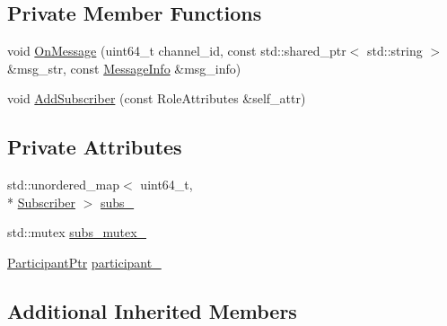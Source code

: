 \subsection*{Private Member Functions}
\begin{DoxyCompactItemize}
\item 
void \hyperlink{classapollo_1_1cyber_1_1transport_1_1RtpsDispatcher_a59c0136136c1062cb86462ff2a4e7acc}{On\-Message} (uint64\-\_\-t channel\-\_\-id, const std\-::shared\-\_\-ptr$<$ std\-::string $>$ \&msg\-\_\-str, const \hyperlink{classapollo_1_1cyber_1_1transport_1_1MessageInfo}{Message\-Info} \&msg\-\_\-info)
\item 
void \hyperlink{classapollo_1_1cyber_1_1transport_1_1RtpsDispatcher_afe72ad9b8c0d3c5a94fb623a334013c1}{Add\-Subscriber} (const Role\-Attributes \&self\-\_\-attr)
\end{DoxyCompactItemize}
\subsection*{Private Attributes}
\begin{DoxyCompactItemize}
\item 
std\-::unordered\-\_\-map$<$ uint64\-\_\-t, \\*
\hyperlink{structapollo_1_1cyber_1_1transport_1_1Subscriber}{Subscriber} $>$ \hyperlink{classapollo_1_1cyber_1_1transport_1_1RtpsDispatcher_a8ff80d52b17b3a5c07d960078ee14914}{subs\-\_\-}
\item 
std\-::mutex \hyperlink{classapollo_1_1cyber_1_1transport_1_1RtpsDispatcher_a78bc088bc5b4c3d9fb0624e4d9a8b098}{subs\-\_\-mutex\-\_\-}
\item 
\hyperlink{namespaceapollo_1_1cyber_1_1transport_a4214d0780331276d0384d0b57e3bc688}{Participant\-Ptr} \hyperlink{classapollo_1_1cyber_1_1transport_1_1RtpsDispatcher_a8c472e08afebd0087e51fe5b9eeae6e4}{participant\-\_\-}
\end{DoxyCompactItemize}
\subsection*{Additional Inherited Members}


